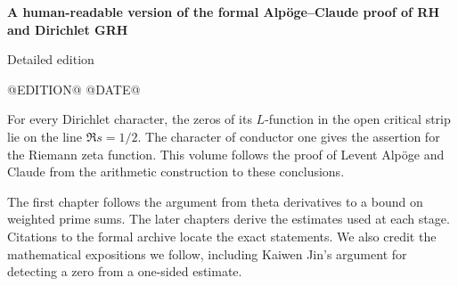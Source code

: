 \documentclass[10pt,a4paper,oneside,openany]{report}
\theoremstyle{remark}\newtheorem{remark}[theorem]{Remark}
\begin{document}
\begin{titlepage}
\vspace*{16mm}
{\color{ink}\LARGE\bfseries A human-readable version of the formal Alpöge–Claude proof of RH and Dirichlet GRH\par}
\vspace{5mm}
{\Large Detailed edition\par}
\vspace{3mm}
@EDITION@ \quad @DATE@\par
\vspace{10mm}
For every Dirichlet character, the zeros of its $L$-function in the open critical strip lie on the line $\Re s=1/2$. The character of conductor one gives the assertion for the Riemann zeta function. This volume follows the proof of Levent Alpöge and Claude from the arithmetic construction to these conclusions.
\par\medskip
The first chapter follows the argument from theta derivatives to a bound on weighted prime sums. The later chapters derive the estimates used at each stage. Citations to the formal archive locate the exact statements. We also credit the mathematical expositions we follow, including Kaiwen Jin's argument for detecting a zero from a one-sided estimate.
\par\medskip

\end{titlepage}
\end{document}
